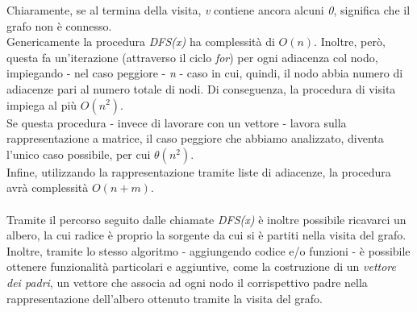Chiaramente, se al termina della visita, \textit{v} contiene ancora alcuni \textit{0}, significa che il grafo non è connesso. \\
Genericamente la procedura \textit{DFS(x)} ha complessità di $O(n)$. Inoltre, però, questa fa un'iterazione (attraverso il ciclo \textit{for}) per ogni adiacenza col nodo, impiegando - nel caso peggiore - \textit{n} - caso in cui, quindi, il nodo abbia numero di adiacenze pari al numero totale di nodi. Di conseguenza, la procedura di visita impiega al più $O(n^2)$. \\
Se questa procedura - invece di lavorare con un vettore - lavora sulla rappresentazione a matrice, il caso peggiore che abbiamo analizzato, diventa l'unico caso possibile, per cui $\theta(n^2)$. \\
Infine, utilizzando la rappresentazione tramite liste di adiacenze, la procedura avrà complessità $O(n+m)$. \\\\
Tramite il percorso seguito dalle chiamate \textit{DFS(x)} è inoltre possibile ricavarci un albero, la cui radice è proprio la sorgente da cui si è partiti nella visita del grafo. \\
Inoltre, tramite lo stesso algoritmo - aggiungendo codice e/o funzioni - è possibile ottenere funzionalità particolari e aggiuntive, come la costruzione di un \textit{vettore dei padri}, un vettore che associa ad ogni nodo il corrispettivo padre nella rappresentazione dell'albero ottenuto tramite la visita del grafo.